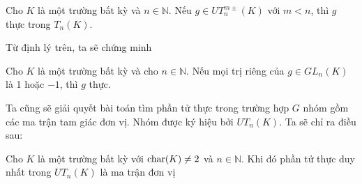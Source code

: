 \begin{thm} \label{thm:main1.1}
    Cho $K$ là một trường bất kỳ và $n \in \mathbb{N}$. Nếu $g \in UT_n^{m\pm} (K)$ với $m < n$, thì $g$ thực trong $T_n(K)$.
\end{thm}

Từ định lý trên, ta sẽ chứng minh

\begin{thm}
\label{thm:main1.2}
    Cho $K$ là một trường bất kỳ và cho $n \in \mathbb{N}$. Nếu mọi trị riêng của $g \in GL_n(K)$ là 1 hoặc $-1$, thì $g$ thực.
\end{thm}

Ta cũng sẽ giải quyết bài toán tìm phần tử thực trong trường hợp $G$ nhóm gồm các ma trận tam giác đơn vị. Nhóm được ký hiệu bởi $UT_n(K)$. Ta sẽ chỉ ra điều sau:

\begin{thm} \label{thm:main1.3}
    Cho $K$ là một trường bất kỳ với $\operatorname{char}(K) \neq 2$ và $n \in \mathbb{N}$. Khi đó phần tử thực duy nhất trong $UT_n(K)$ là ma trận đơn vị
\end{thm}